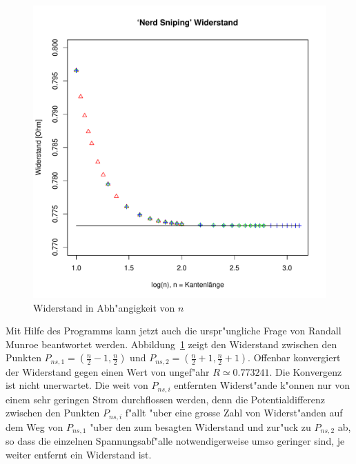 \begin{figure}
\begin{center}
\includegraphics[width=\hsize]{applications/snipingresistance}
\end{center}
\caption{Widerstand in Abh"angigkeit von $n$\label{snipingresistance}}
\end{figure}
Mit Hilfe des Programms kann jetzt auch die urspr"ungliche Frage von
Randall Munroe beantwortet werden. Abbildung~\ref{snipingresistance} zeigt
den Widerstand zwischen den Punkten $P_{ns,1}=(\frac{n}2-1,\frac{n}2)$ und
$P_{ns,2}=(\frac{n}2+1,\frac{n}2+1)$. Offenbar konvergiert der Widerstand
gegen einen Wert von ungef"ahr $R\simeq 0.773241$.  Die Konvergenz
ist nicht unerwartet.  Die weit von $P_{ns,i}$ entfernten Widerst"ande
k"onnen nur von einem sehr geringen Strom durchflossen werden, denn die
Potentialdifferenz zwischen den Punkten $P_{ns,i}$ f"allt "uber eine
grosse Zahl von Widerst"anden auf dem Weg von $P_{ns,1}$ "uber den zum
besagten Widerstand und zur"uck zu $P_{ns,2}$ ab, so dass die einzelnen
Spannungsabf"alle notwendigerweise umso geringer sind, je weiter entfernt
ein Widerstand ist.



